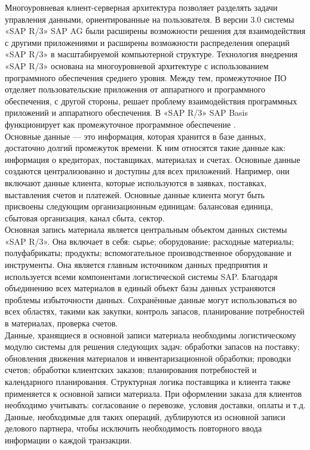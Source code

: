 \indent Многоуровневая клиент-серверная архитектура позволяет разделять задачи управления данными, ориентированные на пользователя.
В версии 3.0 системы «SAP R/3» SAP AG были расширены возможности решения для взаимодействия с другими приложениями и расширены возможности распределения операций «SAP R/3» в масштабируемой компьютерной структуре. 
Технология внедрения «SAP R/3» основана на многоуровневой архитектуре с использованием программного обеспечения среднего уровня. 
Между тем, промежуточное ПО отделяет пользовательские приложения от аппаратного и программного обеспечения, с другой стороны, решает проблему взаимодействия программных приложений и аппаратного обеспечения. 
В «SAP R/3» SAP Basis функционирует как промежуточное программное обеспечение \cite{mazBook}.\\
\indent Основные данные — это информация, которая хранится в базе данных, достаточно долгий промежуток времени. 
К ним относятся такие данные как: информация о кредиторах, поставщиках, материалах и счетах. 
Основные данные создаются централизованно и доступны для всех приложений. 
Например, они включают данные клиента, которые используются в заявках, поставках, выставления счетов и платежей. 
Основные данные клиента могут быть присвоены следующим организационным единицам: балансовая единица, сбытовая организация, канал сбыта, сектор.\\
\indent Основная запись материала является центральным объектом данных системы «SAP R/3». 
Она включает в себя: сырье; оборудование; расходные материалы; полуфабрикаты; продукты; вспомогательное производственное оборудование и инструменты. 
Она является главным источником данных предприятия и используется всеми компонентами логистической системы SAP. 
Благодаря объединению всех материалов в единый объект базы данных устраняются проблемы избыточности данных. 
Сохранённые данные могут использоваться во всех областях, такими как закупки, контроль запасов, планирование потребностей в материалах, проверка счетов.\\
\indent Данные, хранящиеся в основной записи материала необходимы логистическому модулю системы для решения следующих задач: обработки запасов на поставку; обновления движения материалов и инвентаризационной обработки; проводки счетов; обработки клиентских заказов; планирования потребностей и календарного планирования. 
Структурная логика поставщика и клиента также применяется к основной записи материала. 
При оформлении заказа для клиентов необходимо учитывать: согласование о перевозке, условия доставки, оплаты и т.д. 
Данные, необходимые для таких операций, дублируются из основной записи делового партнера, чтобы исключить необходимость повторного ввода информации о каждой транзакции. 
